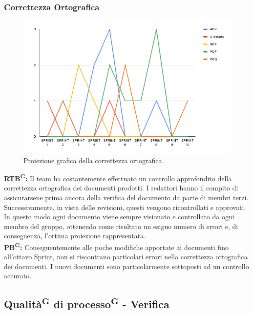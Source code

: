 \documentclass[8pt]{article}
\newcommand{\glossterm}[1]{#1\textsuperscript{G}} %
\begin{document}
\subsubsection{Correttezza Ortografica}
\begin{figure}[h!]
    \centering
    \includegraphics[width=1\textwidth]{images_pdq/CO.png}
    \caption{Proiezione grafica della correttezza ortografica.}
    \label{fig:Proiezione grafica della correttezza ortografica}
\end{figure}
\textbf{\glossterm{RTB}:} Il team ha costantemente effettuato un controllo approfondito della correttezza ortografica dei documenti prodotti. I redattori hanno il compito di assicurarsene prima ancora della verifica del documento da parte di membri terzi. Successivamente, in vista delle revisioni, questi vengono ricontrollati e approvati. In questo modo ogni documento viene sempre visionato e controllato da ogni membro del gruppo, ottenendo come risultato un esiguo numero di errori e, di conseguenza, l'ottima proiezione rappresentata.\\
\textbf{\glossterm{PB}:} Conseguentemente alle poche modifiche apportate ai documenti fino all'ottavo Sprint, non si riscontrano particolari errori nella correttezza ortografica dei documenti. I nuovi documenti sono particolarmente sottoposti ad un controllo accurato.
\clearpage
\subsection{\glossterm{Qualità} di \glossterm{processo} - Verifica}
\end{document}
